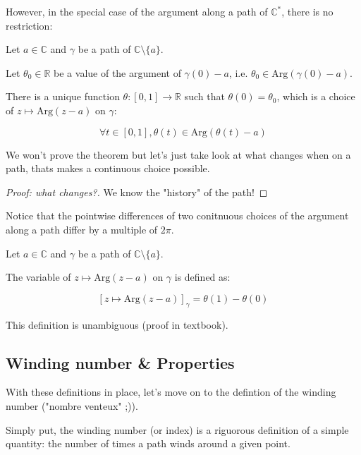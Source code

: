 However, in the special case of the argument along a path of $\mathbb{C}^*$, there is no restriction:

\begin{thm*}
    Let $a\in\mathbb{C}$ and $\gamma$ be a path of $\mathbb{C} \setminus \lbrace a \rbrace$.

    Let $\theta_0\in\mathbb{R}$ be a value of the argument of $\gamma(0) - a$, i.e. $\theta_0 \in \mathrm{Arg}(\gamma(0) - a)$.

    There is a unique function $\theta: [0,1] \rightarrow \mathbb{R}$ such that $\theta(0) = \theta_0$, which is a choice of $z \mapsto \mathrm{Arg}(z-a)$ on $\gamma$:

    $$\forall t \in [0,1], \theta(t) \in \mathrm{Arg}(\theta(t) - a) $$
\end{thm*}

We won't prove the theorem but let's just take look at what changes when on a path, thats makes a continuous choice possible.

\begin{proof}[Proof: what changes?]
We know the "history" of the path!
\end{proof}

\begin{note}
    Notice that the pointwise differences of two conitnuous choices of the argument along a path differ by a multiple of $2\pi$.
\end{note}

\begin{defi}
    Let $a\in\mathbb{C}$ and $\gamma$ be a path of $\mathbb{C} \setminus \lbrace a \rbrace$.

    The variable of $z \mapsto \mathrm{Arg}(z-a)$ on $\gamma$ is defined as:

    $$[z \mapsto \mathrm{Arg}(z-a)]_\gamma = \theta(1) - \theta(0) $$

    This definition is unambiguous (proof in textbook).
\end{defi}

\subsection{Winding number \& Properties}
With these definitions in place, let's move on to the defintion of the winding number ("nombre venteux" ;)). 

Simply put, the winding number (or index) is a riguorous definition of a simple quantity: the number of times a path winds around a given point.

